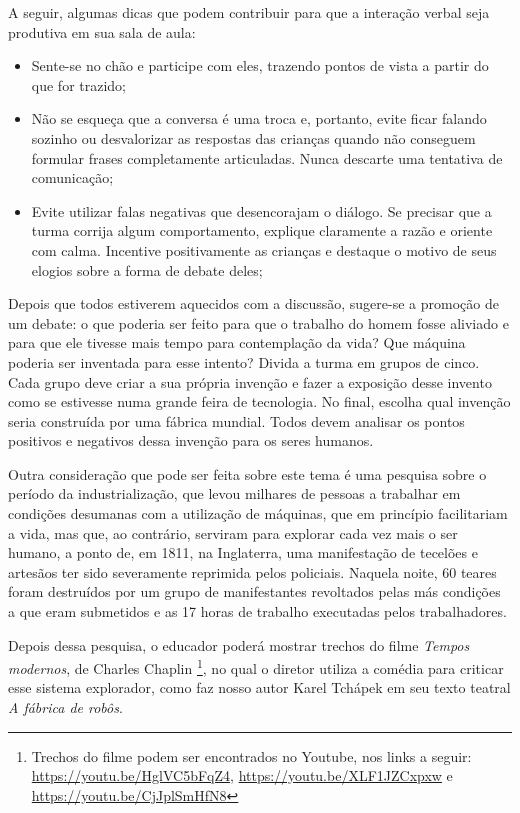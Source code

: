 \documentclass[11pt]{extarticle}
\begin{document}
A seguir, algumas dicas que podem contribuir para que a interação verbal seja produtiva em sua sala de aula: 

\begin{itemize}
\item Sente-se no chão e participe com eles, trazendo pontos de vista a partir do que for trazido;

\item Não se esqueça que a conversa é uma troca e, portanto, evite ficar falando sozinho ou desvalorizar as respostas das 
crianças quando não conseguem formular frases completamente articuladas. Nunca descarte uma tentativa de comunicação; 

\item Evite utilizar falas negativas que desencorajam o diálogo. Se precisar que a turma corrija algum comportamento, explique claramente a razão e oriente com calma. Incentive positivamente as crianças e destaque o motivo de seus elogios sobre a forma de debate deles; 

\end{itemize}

Depois que todos estiverem aquecidos com a discussão, sugere-se a promoção de um debate: o que poderia ser feito para que o trabalho do homem fosse aliviado e para que ele tivesse mais tempo para contemplação da vida? Que máquina poderia ser inventada para esse intento? Divida a turma em grupos de cinco. Cada grupo deve criar a sua própria invenção e fazer a exposição desse invento como se estivesse numa grande feira de tecnologia. No final, escolha qual invenção seria construída por uma fábrica mundial. Todos devem analisar os pontos positivos e negativos dessa invenção para os seres humanos.



Outra consideração que pode ser feita sobre este tema é uma pesquisa sobre o período da industrialização, que levou milhares de pessoas a trabalhar em condições desumanas com a utilização de máquinas, que em princípio facilitariam a vida, mas que, ao contrário, serviram para explorar cada vez mais o ser humano, a ponto de, em 1811, na Inglaterra, uma manifestação de tecelões e artesãos ter sido severamente reprimida pelos policiais. Naquela noite, 60 teares foram destruídos por um grupo de manifestantes revoltados pelas más condições a que eram submetidos e as 17 horas de trabalho executadas pelos trabalhadores. 

Depois dessa pesquisa, o educador poderá mostrar trechos do filme \textit{Tempos modernos}, de Charles Chaplin \footnote{Trechos do filme podem ser encontrados no Youtube, nos links a seguir: \url{https://youtu.be/HglVC5bFqZ4}, \url{https://youtu.be/XLF1JZCxpxw} e \url{https://youtu.be/CjJplSmHfN8}}, no qual o diretor utiliza a comédia para criticar esse sistema explorador, como faz nosso autor Karel Tchápek em seu texto teatral \textit{A fábrica de robôs}. 
\end{document}
